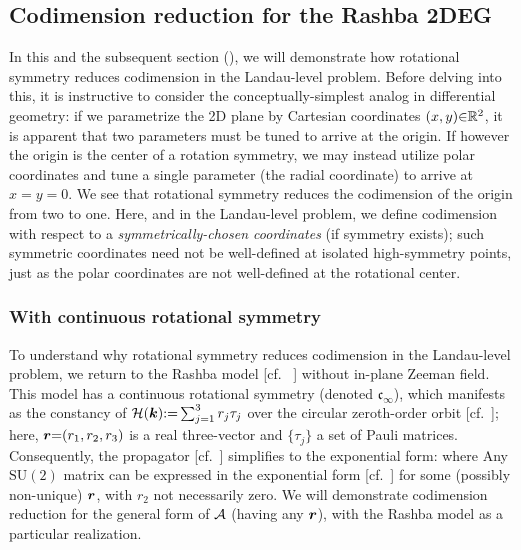\documentclass[aps, prb, showpacs, twocolumn, notitlepage, superscriptaddress]{revtex4-1}
\begin{document}


\subsection{Codimension reduction for the Rashba 2DEG}\label{sec:singleparameterrashba}


In this and the subsequent section (), we will demonstrate how rotational symmetry reduces codimension in the Landau-level problem. Before delving into this, it is instructive to consider the conceptually-simplest analog in differential geometry: if we parametrize the 2D plane by Cartesian coordinates $(x,y){\in}\mathbb{R}^2$, it is apparent that two parameters must be tuned to arrive at the origin. If however the origin is the center of a rotation symmetry, we may instead utilize polar coordinates and tune a single parameter (the radial coordinate) to arrive at $x{=}y{=}0$. We see that rotational symmetry reduces the codimension of the origin from two to one. Here, and in the  Landau-level problem, we define codimension with respect to a \textit{symmetrically-chosen coordinates} (if symmetry exists); such symmetric coordinates need not be well-defined at isolated high-symmetry points, just as the polar coordinates are not well-defined at the rotational center.


\subsubsection{With continuous rotational symmetry}\label{sec:ctsrot}

To understand why rotational symmetry reduces codimension in the Landau-level problem, we return to the Rashba model [cf. \ ] without in-plane Zeeman field. This model has a continuous rotational symmetry (denoted $\mathfrak{c}_{\infty}$), which manifests as the constancy of ${\cal H}(\boldsymbol{k}){:}{=}\sum_{j=1}^3r_j\tau_j$ over the circular zeroth-order orbit [cf.\ ]; here, $\boldsymbol{r}{=}(r_1,r_2,r_3)$ is a real three-vector and $\{\tau_j\}$ a set of Pauli matrices. Consequently, the propagator [cf.\ ] simplifies to the exponential form:
where
Any $\text{SU}(2)$ matrix can be expressed in the exponential form [cf.\ ] for some (possibly non-unique) $\boldsymbol{r}$, with $r_2$ not necessarily zero. We will demonstrate codimension reduction for the general form of ${\cal A}$ (having any $\boldsymbol{r}$), with the Rashba model as a particular realization.
\end{document}

